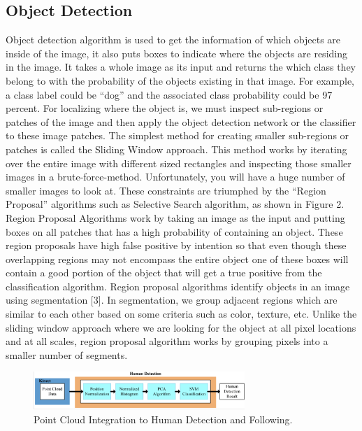 \documentclass{ndjflart}
\theoremstyle{definition}
\theoremstyle{remark}
\begin{document}
\subsection{Object Detection}\label{fonts} 
%
Object detection algorithm is used to get the information of which objects are inside of the image, it also puts boxes to indicate where the objects are residing in the image. It takes a whole image as its input and returns the which class they belong to with the probability of the objects existing in that image. For example, a class label could be “dog” and the associated class probability could be 97 percent. For localizing where the object is, we must inspect sub-regions or patches of the image and then apply the object detection network or the classifier to these image patches. The simplest method for creating smaller sub-regions or patches is called the Sliding Window approach. This method works by iterating over the entire image with different sized rectangles and inspecting those smaller images in a brute-force-method. Unfortunately, you will have a huge number of smaller images to look at. These constraints are triumphed by the “Region Proposal” algorithms such as Selective Search algorithm, as shown in Figure 2. Region Proposal Algorithms work by taking an image as the input and putting boxes on all patches that has a high probability of containing an object. These region proposals have high false positive by intention so that even though these overlapping regions may not encompass the entire object one of these boxes will contain a good portion of the object that will get a true positive from the classification algorithm. Region proposal algorithms identify objects in an image using segmentation [3]. In segmentation, we group adjacent regions which are similar to each other based on some criteria such as color, texture, etc. Unlike the sliding window approach where we are looking for the object at all pixel locations and at all scales, region proposal algorithm works by grouping pixels into a smaller number of segments. 

\begin{figure}
\begin{center}
\vspace{0.5em}
    \includegraphics[width=8cm]{images/pointcloud2}
    \vspace{-.5em}
\caption{Point Cloud Integration to Human Detection and Following. }
\label{fig:framework}
    \end{center}
\end{figure}
\end{document}

